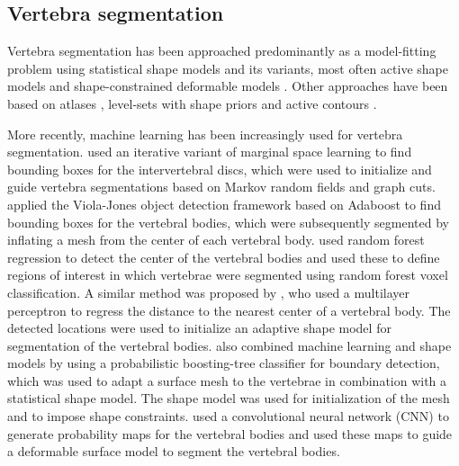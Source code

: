 \documentclass[authoryear,5p,final,times]{elsarticle}
\begin{document}
    \subsection{Vertebra segmentation}

    Vertebra segmentation has been approached predominantly as a model-fitting problem using statistical shape models and its variants, most often active shape models and shape-constrained deformable models \citep{CastroMateos2015,Ibragimov2014,Ibragimov2015,Kadoury2011,Kadoury2013,Klinder2009,Korez2015,Korez2016,Mastmeyer2006,Mirzaalian2013,Pereanez2015,Rasoulian2013,Stern2011,Suzani2015,Yang2017,Leventon2002}. Other approaches have been based on atlases \citep{Wang2015}, level-sets with shape priors \citep{Leventon2002,Lim2014} and active contours \citep{Hammernik2015,Athertya2016}.

    More recently, machine learning has been increasingly used for vertebra segmentation. \citet{Kelm2013} used an iterative variant of marginal space learning to find bounding boxes for the intervertebral discs, which were used to initialize and guide vertebra segmentations based on Markov random fields and graph cuts. \citet{Zukic2014} applied the Viola-Jones object detection framework based on Adaboost to find bounding boxes for the vertebral bodies, which were subsequently segmented by inflating a mesh from the center of each vertebral body. \citet{Chu2015} used random forest regression to detect the center of the vertebral bodies and used these to define regions of interest in which vertebrae were segmented using random forest voxel classification. A similar method was proposed by \citet{Suzani2015}, who used a multilayer perceptron to regress the distance to the nearest center of a vertebral body. The detected locations were used to initialize an adaptive shape model for segmentation of the vertebral bodies. \citet{Mirzaalian2013} also combined machine learning and shape models by using a probabilistic boosting-tree classifier for boundary detection, which was used to adapt a surface mesh to the vertebrae in combination with a statistical shape model. The shape model was used for initialization of the mesh and to impose shape constraints. \citet{Korez2016} used a convolutional neural network (CNN) to generate probability maps for the vertebral bodies and used these maps to guide a deformable surface model to segment the vertebral bodies.
\end{document}
